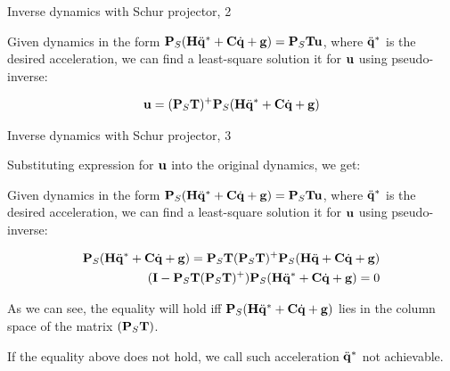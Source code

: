 \documentclass{beamer}
\begin{document}
\begin{frame}{Inverse dynamics with Schur projector, 2}
	\begin{flushleft}
		
		Given dynamics in the form $\mathbf{P}_S(\mathbf{H}\ddot{\mathbf{q}}^* + \mathbf{C}\dot{\mathbf{q}}+ \mathbf{g}) = \mathbf{P}_S\mathbf{T}\mathbf{u}$, where $\ddot{\mathbf{q}}^*$ is the desired acceleration, we can find a least-square solution it for $\mathbf{u}$ using pseudo-inverse:
		
		\begin{align}
			\mathbf{u}
			=
			(\mathbf{P}_S\mathbf{T})^+\mathbf{P}_S(\mathbf{H}\ddot{\mathbf{q}}^* + \mathbf{C}\dot{\mathbf{q}}+ \mathbf{g})
		\end{align}
		
		
	\end{flushleft}
\end{frame}



\begin{frame}{Inverse dynamics with Schur projector, 3}
	\begin{flushleft}
		
		Substituting expression for  $\mathbf{u}$ into the original dynamics, we get:
		
		Given dynamics in the form $\mathbf{P}_S(\mathbf{H}\ddot{\mathbf{q}}^* + \mathbf{C}\dot{\mathbf{q}}+ \mathbf{g}) = \mathbf{P}_S\mathbf{T}\mathbf{u}$, where $\ddot{\mathbf{q}}^*$ is the desired acceleration, we can find a least-square solution it for $\mathbf{u}$ using pseudo-inverse:
		
		\begin{align}
			\mathbf{P}_S(\mathbf{H}\ddot{\mathbf{q}}^* + \mathbf{C}\dot{\mathbf{q}}+ \mathbf{g}) = \mathbf{P}_S\mathbf{T}(\mathbf{P}_S\mathbf{T})^+\mathbf{P}_S(\mathbf{H}\ddot{\mathbf{q}} + \mathbf{C}\dot{\mathbf{q}}+ \mathbf{g})
			\\
			(\mathbf{I}-\mathbf{P}_S\mathbf{T}(\mathbf{P}_S\mathbf{T})^+)\mathbf{P}_S(\mathbf{H}\ddot{\mathbf{q}}^* + \mathbf{C}\dot{\mathbf{q}}+ \mathbf{g}) = 0
		\end{align}
		
		As we can see, the equality will hold iff $\mathbf{P}_S(\mathbf{H}\ddot{\mathbf{q}}^* + \mathbf{C}\dot{\mathbf{q}}+ \mathbf{g})$ lies in the column space of the matrix $(\mathbf{P}_S\mathbf{T})$.
		
		\bigskip
		
		If the equality above does not hold, we call such acceleration $\ddot{\mathbf{q}}^*$ not achievable.
		
	\end{flushleft}
\end{frame}
\end{document}

